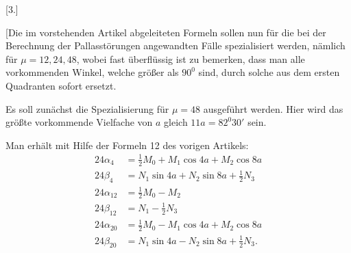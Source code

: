 \clearpage
\begin{landscape}
\begingroup
\fontsize{9.5}{12}\selectfont
{}
\renewcommand{\headrulewidth}{0pt}
\makeatletter\tagsleft@true\let\veqno\@@leqno\makeatother
\setlength{\lineskip}{4pt}\setlength{\lineskiplimit}{4pt}
\newcommand{\VthreeTerminalPair}{\mathord{\text{\makebox[.14em][l]{\raisebox{.75ex}{\rule{.055em}{.16ex}}\kern-.055em\raisebox{-.18ex}{,}}}}}
\newcommand{\VthreeRaisedPoint}{\mathord{\text{\raisebox{.5ex}{.}}}}
\newcommand{\VthreeLowDash}{\mathord{\text{\makebox[0pt][l]{\kern-.06em\raisebox{-.32ex}{\rule{.15em}{.045ex}}}}}}
\newcommand{\VthreeBrokenMark}{\mathord{\text{\makebox[.1em][l]{\raisebox{.8ex}{\rule{.055em}{.22ex}}\kern-.055em\raisebox{-.1ex}{\rule{.08em}{.5ex}}}}}}
\newcommand{\VthreeLowMark}{\mathord{\text{\makebox[0pt][l]{\kern-.1em\raisebox{-.65ex}{,}}}}}
\newcommand{\VthreeVerticalMark}{\mathord{\text{\makebox[.1em][l]{\raisebox{-.1ex}{\rule{.08em}{1.1ex}}}}}}
\begin{center}[3.]\end{center}
\par\noindent\hspace*{\parindent}[Die im vorstehenden Artikel abgeleiteten Formeln sollen nun für die bei der Berechnung der Pallasstörungen angewandten Fälle spezialisiert werden, nämlich für \(\mu=12,24,48\), wobei fast überflüssig ist zu bemerken, dass man alle vorkommenden Winkel, welche größer als \(90^0\) sind, durch solche aus dem ersten Quadranten sofort ersetzt.
\par\noindent\hspace*{\parindent}Es soll zunächst die Spezialisierung für \(\mu=48\) ausgeführt werden. Hier wird das größte vorkommende Vielfache von \(a\) gleich \(11a=82^0 30'\) sein.
\par\noindent\hspace*{\parindent}Man erhält mit Hilfe der Formeln 12 des vorigen Artikels:
\[
\tag*{1)}
\begin{aligned}
24\alpha_4&=\tfrac12 M_0+M_1\cos4a+M_2\cos8a\\
24\beta_4&=N_1\sin4a+N_2\sin8a+\tfrac12 N_3\\[4pt]
24\alpha_{12}&=\tfrac12 M_0-M_2\\
24\beta_{12}&=N_1-\tfrac12 N_3\\[4pt]
24\alpha_{20}&=\tfrac12 M_0-M_1\cos4a+M_2\cos8a\\
24\beta_{20}&=N_1\sin4a-N_2\sin8a+\tfrac12 N_3.

\end{aligned}\]
\end{landscape}
